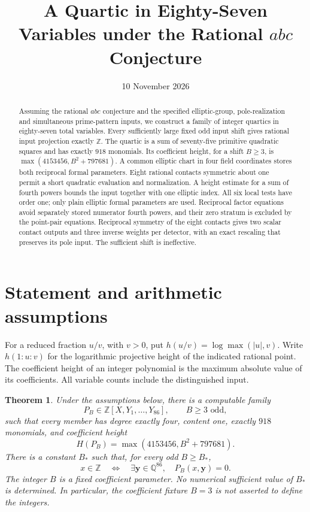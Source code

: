 \documentclass[11pt,a4paper]{article}
\title{A Quartic in Eighty-Seven Variables under the Rational $abc$ Conjecture}
\author{}\date{10 November 2026}
\newtheorem{theorem}{Theorem}[section]
\newcommand{\Q}{\mathbb Q}\newcommand{\Z}{\mathbb Z}
\begin{document}
\maketitle
\begin{abstract}
Assuming the rational $abc$ conjecture and the specified elliptic-group,
pole-realization and simultaneous prime-pattern inputs, we construct a
family of integer quartics in eighty-seven total variables. Every
sufficiently large fixed odd input shift gives rational input projection
exactly $\Z$. The quartic is a sum of seventy-five primitive quadratic
squares and has exactly $918$ monomials. Its coefficient height, for a
shift $B\ge3$, is $\max(4153456,B^2+797681)$. A common elliptic chart in four field coordinates stores both reciprocal
formal parameters. Eight rational contacts symmetric about one permit a short quadratic evaluation and normalization.
A height estimate for a sum of fourth powers bounds the input together
with one elliptic index. All six local tests have order one; only plain
elliptic formal parameters are used. Reciprocal factor equations
avoid separately stored numerator fourth powers, and their zero stratum
is excluded by the point-pair equations. Reciprocal symmetry of the eight contacts gives two scalar contact
outputs and three inverse weights per detector, with an exact
rescaling that preserves its pole input. The sufficient shift is ineffective.
\end{abstract}

\section{Statement and arithmetic assumptions}

For a reduced fraction $u/v$, with $v>0$, put
$h(u/v)=\log\max(|u|,v)$. Write $h(1:u:v)$ for the logarithmic
projective height of the indicated rational point. The coefficient height
of an integer polynomial is the maximum absolute value of its coefficients.
All variable counts include the distinguished input.

\begin{theorem}\label{thm:main}
Under the assumptions below, there is a computable family
\[
 P_B\in\Z[X,Y_1,\ldots,Y_{86}],\qquad B\ge3\text{ odd},
\]
such that every member has degree exactly four, content one, exactly
$918$ monomials, and coefficient height
\[
 H(P_B)=\max(4153456,B^2+797681).
\]
There is a constant $B_*$ such that, for every odd $B\ge B_*$,
\[
 x\in\Z\quad\Longleftrightarrow\quad
 \exists\boldsymbol y\in\Q^{86},\quad P_B(x,\boldsymbol y)=0.
\]
The integer $B$ is a fixed coefficient parameter. No numerical sufficient
value of $B_*$ is determined. In particular, the coefficient fixture
$B=3$ is not asserted to define the integers.
\end{theorem}
\end{document}
